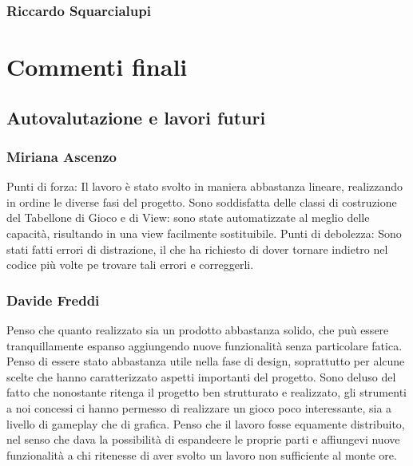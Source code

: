 \documentclass[a4paper,12pt]{report}
\begin{document}
	\subsection{Riccardo Squarcialupi}

	\chapter{Commenti finali}

    \section{Autovalutazione e lavori futuri}

    \subsection{Miriana Ascenzo}
    Punti di forza:
    Il lavoro è stato svolto in maniera abbastanza lineare, realizzando in ordine le diverse fasi del progetto.
    Sono soddisfatta delle classi di costruzione del Tabellone di Gioco e di View:
    sono state automatizzate al meglio delle capacità, risultando in una view facilmente sostituibile.\newline
    Punti di debolezza:
    Sono stati fatti errori di distrazione, il che ha richiesto di dover tornare indietro nel codice più volte pe trovare tali errori e correggerli.


    \subsection{Davide Freddi}
    Penso che quanto realizzato sia un prodotto abbastanza solido, che puù essere tranquillamente espanso aggiungendo nuove funzionalità senza particolare fatica.
    Penso di essere stato abbastanza utile nella fase di design, soprattutto per alcune scelte che hanno caratterizzato aspetti importanti del progetto.
    Sono deluso del fatto che nonostante ritenga il progetto ben strutturato e realizzato, gli strumenti a noi concessi ci hanno permesso di realizzare un gioco poco interessante, sia a livello di gameplay che di grafica.
    Penso che il lavoro fosse equamente distribuito, nel senso che dava la possibilità di espandeere le proprie parti e affiungevi nuove funzionalità a chi ritenesse di aver svolto un lavoro non sufficiente al monte ore.
\end{document}

